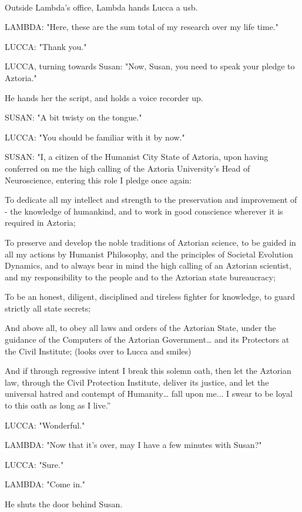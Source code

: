 \documentclass[11pt]{article}
\begin{document}
\ 

Outside Lambda's office, Lambda hands Lucca a usb.

LAMBDA: "Here, these are the sum total of my research over my life time."

LUCCA: "Thank you." 

LUCCA, turning towards Susan: "Now, Susan, you need to speak your pledge to Aztoria."

He hands her the script, and holds a voice recorder up.

SUSAN: "A bit twisty on the tongue."

LUCCA: "You should be familiar with it by now."

SUSAN: "I, a citizen of the Humanist City State of Aztoria, upon having conferred on me the high calling of the Aztoria University’s Head of Neuroscience, entering this role I pledge once again:

To dedicate all my intellect and strength to the preservation and improvement of - the knowledge of humankind, and to work in good conscience wherever it is required in Aztoria;

To preserve and develop the noble traditions of Aztorian science, to be guided in all my actions by Humanist Philosophy, and the principles of  Societal Evolution Dynamics, and to always bear in mind the high calling of an Aztorian scientist, and my responsibility to the people and to the Aztorian state bureaucracy;

To be an honest, diligent, disciplined and tireless fighter for knowledge, to guard strictly all state secrets;

And above all, to obey all laws and orders of the Aztorian State, under the guidance of the Computers of the Aztorian Government… and its Protectors at the Civil Institute; (looks over to Lucca and smiles)

And if through regressive intent I break this solemn oath, then let the Aztorian law, through the Civil Protection Institute, deliver its justice, and let the universal hatred and contempt of Humanity… fall upon me... I swear to be loyal to this oath as long as I live.”

LUCCA: "Wonderful."

LAMBDA: "Now that it's over, may I have a few minutes with Susan?"

LUCCA: "Sure."

LAMBDA: "Come in."

He shuts the door behind Susan.

\ 
\end{document}
